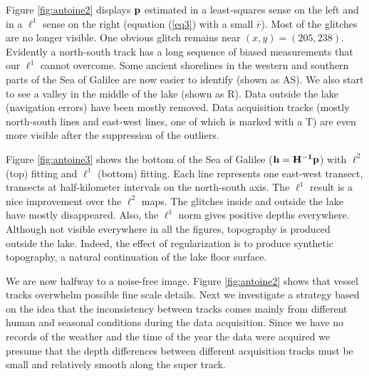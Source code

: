 

\par
Figure \ref{fig:antoine2} displays ${\bf p}$ estimated 
in a least-squares sense on the left and in a $\ell^1$ sense on the right 
(equation (\ref{eq3}) with a small $\bar{r}$).
Most of the glitches are no longer visible.
One obvious glitch remains near $(x,y)=(205,238)$.
Evidently a north-south track has a long sequence of biased measurements
that our $\ell^1$ cannot overcome.
Some ancient shorelines in the western and southern parts of the Sea of
Galilee are now easier to identify (shown as AS).
We also start to see a valley in the middle of the lake (shown as R). 
Data outside the lake (navigation errors) have been mostly removed.
Data acquisition tracks (mostly north-south lines and east-west lines,
one of which is marked with a T)
are even more visible after the suppression of the outliers.



\par
Figure \ref{fig:antoine3}
shows the bottom of the Sea of Galilee (${\bf h = {\bf H^{-1}p}}$)
with $\ell^2$ (top) fitting and  $\ell^1$ (bottom) fitting. 
Each line represents one east-west transect,
transects at half-kilometer intervals on the north-south axis.
The $\ell^1$ result is a nice improvement over the $\ell^2$ maps.
The glitches inside and outside the lake have mostly disappeared.
Also, the $\ell^1$ norm gives positive depths everywhere. 
Although not visible everywhere in all the figures,
topography is produced outside the lake.
Indeed, the effect of regularization is to produce synthetic topography,
a natural continuation of the lake floor surface.


\par
We are now halfway to a noise-free image.
Figure \ref{fig:antoine2} shows that
vessel tracks overwhelm possible fine scale details.
Next we investigate a strategy based on the idea that
the inconsistency between tracks comes mainly 
from different human and seasonal conditions during the data acquisition. 
Since we have no records of the weather and the time 
of the year the data were acquired
we presume that the depth differences between different acquisition tracks
must be small and relatively smooth along the super track.


